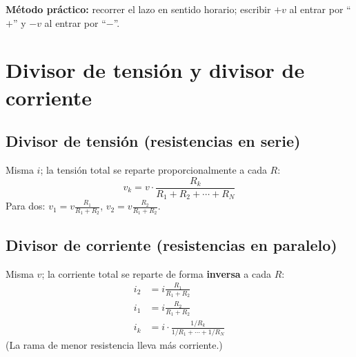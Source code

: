 \documentclass[11pt,a4paper]{article}
\begin{document}
\textbf{Método práctico:} recorrer el lazo en sentido horario; escribir \(+v\) al entrar por ``\(+\)'' y \(-v\) al entrar por ``\(-\)''.

\section{Divisor de tensión y divisor de corriente}

\subsection{Divisor de tensión (resistencias en serie)}
Misma \(i\); la tensión total se reparte proporcionalmente a cada \(R\):
\begin{equation}
v_k = v\cdot\frac{R_k}{R_1+R_2+\cdots+R_N} \tag{2.22}
\end{equation}
Para dos: \(\displaystyle v_1=v\frac{R_1}{R_1+R_2}\),\; \(\displaystyle v_2=v\frac{R_2}{R_1+R_2}\).

\begin{center}
\end{center}

\subsection{Divisor de corriente (resistencias en paralelo)}
Misma \(v\); la corriente total se reparte de forma \textbf{inversa} a cada \(R\):
\begin{align}
i_2 &= i\frac{R_1}{R_1+R_2} \tag{2.23}\\
i_1 &= i\frac{R_2}{R_1+R_2} \tag{2.24}\\
i_k &= i\cdot\frac{1/R_k}{1/R_1+\cdots+1/R_N} \tag{2.25}
\end{align}
(La rama de menor resistencia lleva más corriente.)

\end{document}
